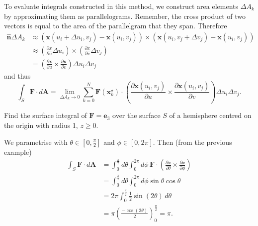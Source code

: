 
To evaluate integrals constructed in this method,
we construct area elements $\Delta A_k$ by approximating them as parallelograms.
Remember, the cross product of two vectors is equal to the area of the parallelgram
that they span.
Therefore
\begin{align*}
    \hat{\bm n} \Delta A_k 
    &\approx (\bm x(u_i + \Delta u_i, v_j) - \bm x(u_i, v_j))
        \times (\bm x(u_i, v_j + \Delta v_j) - \bm x(u_i, v_j)) \\
    &\approx \left( \frac{\partial x}{\partial u} \Delta u_i \right)
        \times \left( \frac{\partial x}{\partial v} \Delta v_j \right) \\
    &= \left( 
            \frac{\partial \bm x}{\partial u} \times \frac{\partial \bm x}{\partial v}
        \right)
        \Delta u_i \Delta v_j
\end{align*}
and thus
\[
    \int_S \bm F \cdot d\bm A
    = \lim_{\Delta A_k \to 0}
        \sum_{k = 0}^N \bm F(\bm x_k^\star) \cdot 
        \left(
            \frac{\partial \bm x(u_i, v_j)}{\partial u} 
            \times \frac{\partial \bm x(u_i, v_j)}{\partial v}
        \right)
        \Delta u_i \Delta v_j.
\]

\begin{example}
    Find the surface integral of $\bm F = \bm e_3$ over the surface $S$
    of a hemisphere centred on the origin with radius 1, $z \geq 0$.
\end{example}

\begin{solution}
    We parametrise with
    $\theta \in \left[0,\frac{\pi}2\right]$
    and
    $\phi \in [0, 2\pi]$.
    Then (from the previous example)
    \begin{align*}
        \int_S \bm F \cdot d\bm A
        &= \int_0^{\frac{\pi}2} d\theta \int_0^{2\pi} d\phi \,
            \bm F \cdot 
            \left(
                \frac{\partial x}{\partial \theta}
                \times
                \frac{\partial x}{\partial \phi}
            \right) \\
        &= \int_0^{\frac{\pi}2} d\theta \int_0^{2\pi} d\phi
            \sin\theta \cos\theta \\
        &= 2\pi \int_0^{\frac{\pi}2} \frac12 \sin(2\theta) \,d\theta \\
        &= \pi \left(\frac{-\cos(2\theta)}2\right)_0^{\frac{\pi}2} = \pi.
    \end{align*}
\end{solution}


